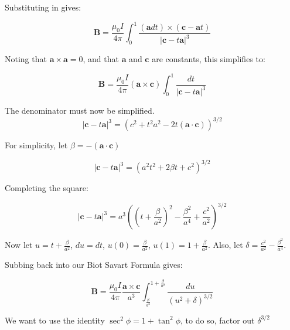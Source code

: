 \documentclass[12pt,a4paper]{report}
\theoremstyle{definition}
\begin{document}
Substituting in gives:

\begin{equation}
  \mathbf{B} = \frac{\mu_0 I}{4\pi} \int_{0}^{1} \frac{(\mathbf{a}dt)\times (\mathbf{c} - \mathbf{a}t)}{\left \vert \mathbf{c} -  t\mathbf{a}\right\vert^3}
\end{equation}

Noting that $\mathbf{a} \times \mathbf{a} = 0$, and that $\mathbf{a}$ and $\mathbf{c}$ are constants, this simplifies to:

\begin{equation} 
  \mathbf{B} = \frac{\mu_0 I}{4\pi}(\mathbf{a} \times \mathbf{c}) \int_{0}^{1}  \frac{dt}{\left \vert \mathbf{c} -  t\mathbf{a}\right\vert^3}
\end{equation}

The denominator must now be simplified.
\begin{equation}
  \left\vert \mathbf{c} - t\mathbf{a} \right \vert ^3 = \left( c^2 + t^2a^2 - 2t(\mathbf{a}\cdot \mathbf{c}) \right)^{3/2}
\end{equation}

For simplicity, let $\beta = -(\mathbf{a} \cdot \mathbf{c})$

\begin{equation}
  \left\vert \mathbf{c} - t\mathbf{a} \right \vert ^3 =  \left( a^2t^2 + 2\beta t + c^2  \right)^{3/2}
\end{equation}

Completing the square:

\begin{equation}
  \left\vert \mathbf{c} - t\mathbf{a} \right \vert ^3 =  a^{3} \left( \left ( t + \frac{\beta}{a^2} \right)^2 -\frac{\beta^2}{a^4} + \frac{c^2}{a^2} \right)^{3/2}
\end{equation}

Now let $u = t + \frac{\beta}{a^2}$, $du = dt$, $u(0) = \frac{\beta}{a^2}$, $u(1) = 1 + \frac{\beta}{a^2}$. Also, let $\delta = \frac{c^2}{a^2} - \frac{\beta^2}{a^4}$.

Subbing back into our Biot Savart Formula gives:

\begin{equation}
  \mathbf{B} = \frac{\mu_0 I}{4\pi} \frac{\mathbf{a} \times \mathbf{c}}{a^3} \int_{\frac{\beta}{a^2}}^{1+\frac{\beta}{a^2}} \frac{du}{\left(u^2 + \delta\right)^{3/2}}
\end{equation}

We want to use the identity $\sec^2\phi = 1 + \tan^2\phi$, to do so, factor out $\delta^{3/2}$
\end{document}
